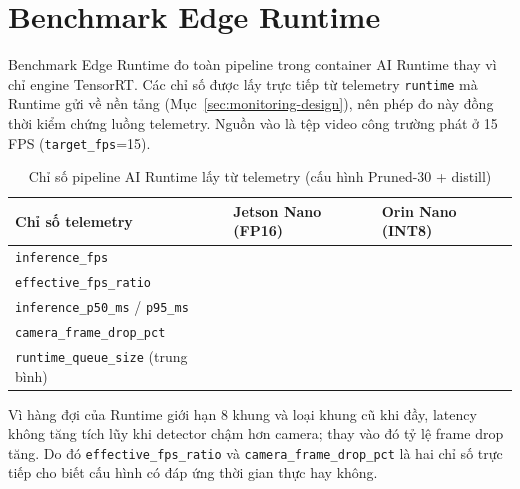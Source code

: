 \section{Benchmark Edge Runtime}

Benchmark Edge Runtime đo toàn pipeline trong container AI Runtime thay vì chỉ
engine TensorRT. Các chỉ số được lấy trực tiếp từ telemetry \texttt{runtime} mà
Runtime gửi về nền tảng (Mục~\ref{sec:monitoring-design}), nên phép đo này đồng
thời kiểm chứng luồng telemetry. Nguồn vào là tệp video công trường phát ở 15 FPS
(\texttt{target\_fps}=15).

\begin{table}[H]
\centering
\caption{Chỉ số pipeline AI Runtime lấy từ telemetry (cấu hình Pruned-30 + distill)}
\label{tab:runtime-pipeline-benchmark}
\begin{tabularx}{\textwidth}{L{6cm}YY}
\toprule
\textbf{Chỉ số telemetry} & \textbf{Jetson Nano (FP16)} & \textbf{Orin Nano (INT8)}\\
\midrule
\texttt{inference\_fps} & \cbs{} & \cbs{}\\
\texttt{effective\_fps\_ratio} & \cbs{} & \cbs{}\\
\texttt{inference\_p50\_ms} / \texttt{p95\_ms} & \cbs{} & \cbs{}\\
\texttt{camera\_frame\_drop\_pct} & \cbs{} & \cbs{}\\
\texttt{runtime\_queue\_size} (trung bình) & \cbs{} & \cbs{}\\
\bottomrule
\end{tabularx}
\end{table}

Vì hàng đợi của Runtime giới hạn 8 khung và loại khung cũ khi đầy, latency không
tăng tích lũy khi detector chậm hơn camera; thay vào đó tỷ lệ frame drop tăng.
Do đó \texttt{effective\_fps\_ratio} và \texttt{camera\_frame\_drop\_pct} là hai chỉ
số trực tiếp cho biết cấu hình có đáp ứng thời gian thực hay không.
